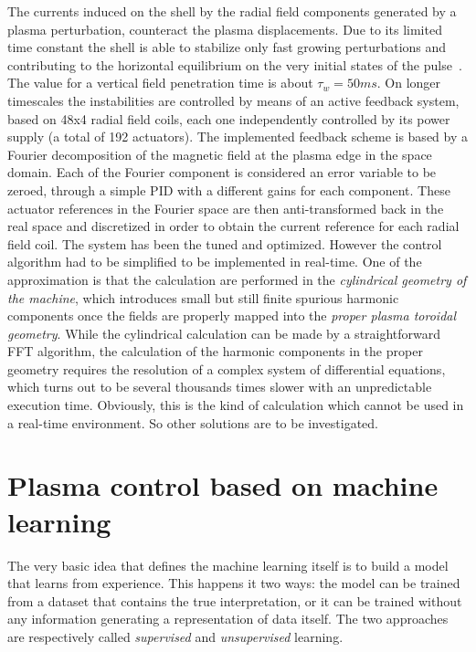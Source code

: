 The currents induced on the shell by the radial field components generated by a plasma perturbation, counteract the plasma displacements. Due to its limited time constant the shell is able to stabilize only fast growing perturbations
and contributing to the horizontal equilibrium on the very initial states of the pulse~\cite{th19}. The value for a vertical field penetration time is about $\tau_w = 50 ms$\cite{th12}.
On longer timescales the instabilities are controlled by means of an active feedback system, based on 48x4 radial field coils, each one independently controlled by its power supply (a total of 192 actuators).
The implemented feedback scheme \cite{ZancaNF2007} is based by a Fourier decomposition  of the magnetic field at the plasma edge in the space domain. Each of the Fourier component is considered an error variable to be zeroed, through a simple PID with a different gains for each component. These actuator references in the Fourier space are then anti-transformed back in the real space and discretized in order to obtain the current reference for each radial field coil.
The system has been the tuned and optimized. However the control algorithm had to be simplified to be implemented in real-time. One of the approximation is that the calculation are performed in the \emph{cylindrical geometry of the machine}, which introduces small but still finite spurious harmonic components once the fields are properly mapped into the \emph{proper plasma toroidal geometry}\cite{ZancaTerranovaPPCF2004}. While the cylindrical calculation can be made by a straightforward FFT algorithm, the calculation of the harmonic components in the proper geometry requires the resolution of a complex system of differential equations, which turns out to be several thousands times slower with an unpredictable execution time.
Obviously, this is the kind of calculation which cannot be used in a real-time environment. So other solutions are to be investigated.

\section{Plasma control based on machine learning}

The very basic idea that defines the machine learning itself is to build a model that learns from experience. This happens it two ways: the model can be trained from a dataset that contains the true interpretation, or it can be trained without any information generating a representation of data itself. The two approaches are respectively called \textit{supervised} and \textit{unsupervised} learning.

